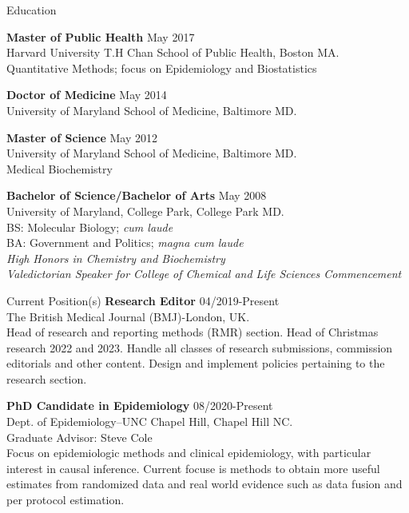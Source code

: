 \documentclass{resume} %
\begin{document}
\begin{rSection}{Education}

{\textbf{Master of Public Health}} \hfill {May 2017}
\\ 
Harvard University T.H Chan School of Public Health, Boston MA. 
\\
Quantitative Methods; focus on Epidemiology and Biostatistics  

{\textbf{Doctor of Medicine}} \hfill {May 2014}
\\ 
University of Maryland School of Medicine, Baltimore MD.

{\textbf{Master of Science}} \hfill {May 2012}
\\ 
University of Maryland School of Medicine, Baltimore MD.
\\
Medical Biochemistry

{\textbf{Bachelor of Science/Bachelor of Arts}} \hfill {May 2008}
\\ 
University of Maryland, College Park, College Park MD.
\\
BS: Molecular Biology; \textit{cum laude}\\
BA: Government and Politics; \textit{magna cum laude}\\
\textit{High Honors in Chemistry and Biochemistry}\\
\textit{Valedictorian Speaker for College of Chemical and Life Sciences Commencement}

\end{rSection}



\begin{rSection}{Current Position(s)}
{\textbf{Research Editor} } \hfill {04/2019-Present}
\\ 
The British Medical Journal (BMJ)-London, UK. 
\\
 Head of research and reporting methods (RMR) section. Head of Christmas research 2022 and 2023. Handle all classes of research submissions, commission editorials and other content. Design and implement policies pertaining to the research section. 

{\textbf{PhD Candidate in Epidemiology}} \hfill {08/2020-Present}
\\ 
Dept. of Epidemiology--UNC Chapel Hill, Chapel Hill NC. 
\\
Graduate Advisor: Steve Cole\\
Focus on epidemiologic methods and clinical epidemiology, with particular interest in causal inference. Current focuse is methods to obtain more useful estimates from randomized data and real world evidence such as data fusion and per protocol estimation.

\end{rSection}
\end{document}
